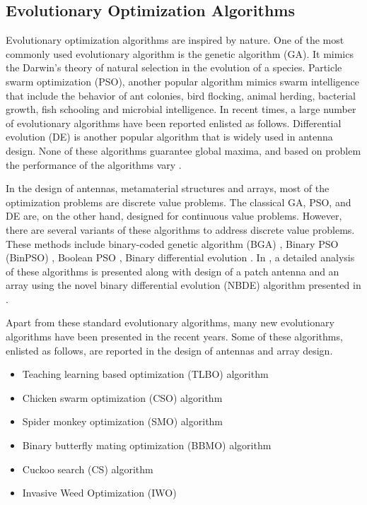 \subsection{Evolutionary Optimization Algorithms}
Evolutionary optimization algorithms are inspired by nature. One of the most commonly used evolutionary algorithm is the genetic algorithm (GA). It mimics the Darwin's theory of natural selection in the evolution of a species. Particle swarm optimization (PSO), another popular algorithm mimics swarm intelligence that include the behavior of ant colonies, bird flocking, animal herding, bacterial growth, fish schooling and microbial intelligence. In recent times, a large number of evolutionary algorithms have been reported enlisted as follows. Differential evolution (DE) is another popular algorithm that is widely used in antenna design. None of these algorithms guarantee global maxima, and based on problem the performance of the algorithms vary \cite{compCAD4Arry}.

In the design of antennas, metamaterial structures and arrays, most of the optimization problems are discrete value problems. The classical GA, PSO, and DE are, on the other hand, designed for continuous value problems. However, there are several variants of these algorithms to address discrete value problems. These methods include binary-coded genetic algorithm (BGA) \cite{optAlgBGAbook, optAlgEMbook}, Binary PSO (BinPSO) \cite{optAlgBPSO}, Boolean PSO \cite{arraySynth1, OptAlgBoolPSO4Ant}, Binary differential evolution \cite{optAlgBinDE, optAlgModBinDE}. In \cite{optAlgDE4AntennaRev}, a detailed analysis of these algorithms is presented along with design of a patch antenna and an array using the novel binary differential evolution (NBDE) algorithm presented in \cite{optAlgModBinDE}.

Apart from these standard evolutionary algorithms, many new evolutionary algorithms have been presented in the recent years. Some of these algorithms, enlisted as follows, are reported in the design of antennas and array design.

\begin{itemize}
\item Teaching learning based optimization (TLBO) algorithm \cite{arraySynth3}
\item Chicken swarm optimization (CSO) algorithm \cite{arraySynth4}
\item Spider monkey optimization (SMO) algorithm \cite{arrayThin1}
\item Binary butterfly mating optimization (BBMO) algorithm \cite{arrayThin2}
\item Cuckoo search (CS) algorithm \cite{CuckooSerach}
\item Invasive Weed Optimization (IWO) \cite{InvasiveWeed}
\end{itemize}


